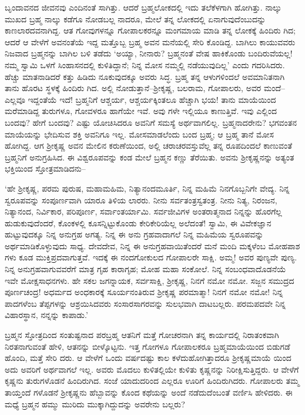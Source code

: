  ಬೃಂದಾವನದ ಜೀವನವು ಎಂದಿನಂತೆ ಸಾಗಿತ್ತು. ಆದರೆ ಬ್ರಹ್ಮಲೋಕದಲ್ಲಿ ಇದು ತಲೆಕೆಳಗಾಗಿ ಹೋಗಿತ್ತು. ನಾಲ್ಕು ಮುಖದ ಬ್ರಹ್ಮ ನಾಲ್ಕು ಕಡೆಗೂ ನೋಡಬಲ್ಲ ನಾದರೂ, ಮೇಲೆ ತನ್ನ ಲೋಕದಲ್ಲಿ ಏನಾಗುವುದೆಂಬುದನ್ನು ಕಾಣಲಾರದವನಾಗಿದ್ದ. ಆತ ಗೋವುಗಳನ್ನೂ ಗೋಪಾಲಕರನ್ನೂ ಮಂಗಮಾಯ ಮಾಡಿ ತನ್ನ ಲೋಕಕ್ಕೆ ಹಿಂದಿರು ಗಿದ; ಆದರೆ ಆ ವೇಳೆಗೆ ಅವನಂತೆಯೆ ಇದ್ದ ಮತ್ತೊಬ್ಬ ಬ್ರಹ್ಮ ಅವನ ಮನೆಯಲ್ಲಿ ಸೇರಿ ಕೊಂಡಿದ್ದ. ಬಾಗಿಲು ಕಾಯುವವರು ನಿಜವಾದ ಬ್ರಹ್ಮನನ್ನು ಬಾಗಿಲ ಬಳಿ ತಡೆದು ‘ಅಯ್ಯಾ, ನೀನಾರು? ಬ್ರಹ್ಮನಂತೆ ವೇಷ ಹಾಕಿಕೊಂಡು ಬಂದಿರುವೆಯಲ್ಲ! ನಮ್ಮ ಸ್ವಾಮಿ ಒಳಗೆ ಸಿಂಹಾಸನದಲ್ಲಿ ಕುಳಿತಿದ್ದಾನೆ; ನಿನ್ನ ಮೋಸ ನಮ್ಮಲ್ಲಿ ನಡೆಯುವುದಿಲ್ಲ’ ಎಂದು ಗದರಿಸಿದರು. ಹೆಚ್ಚು ಮಾತನಾಡಿದರೆ ಕತ್ತು ಹಿಡಿದು ನೂಕುವುದಕ್ಕೂ ಅವರು ಸಿದ್ಧ. ಬ್ರಹ್ಮ ತನ್ನ ಆಳುಗಳಿಂದಲೆ ಅವಮಾನಿತನಾಗಿ ತಾನು ಹೊರಟ ಸ್ಥಳಕ್ಕೆ ಹಿಂದಿರು ಗಿದ. ಅಲ್ಲಿ ನೋಡುತ್ತಾನೆ–ಶ್ರೀಕೃಷ್ಣ, ಬಲರಾಮ, ಗೋಪಾಲರು, ಅವರ ಮಂದೆ– ಎಲ್ಲವೂ ಇದ್ದಂತೆಯೆ ಇದೆ! ಬ್ರಹ್ಮನಿಗೆ ಆಶ್ಚರ್ಯ, ಆಶ್ಚರ್ಯಕ್ಕಿಂತಲೂ ಹೆಚ್ಚಾಗಿ ಭಯ! ತಾನು ಮಾಯೆಯಿಂದ ಮರೆಮಾಡಿದ್ದ ತುರುಗಳೂ, ಗೋವಳರೂ ಹಾಗೆಯೇ ಇವೆ. ಅವು ಗಳೇ ಇಲ್ಲಿಯೂ ಕಾಣುತ್ತಿವೆ. ಇವು ಎಲ್ಲಿಂದ ಬಂದವು? ಹೇಗೆ ಬಂದವು? ಎಷ್ಟು ಯೋಚಿಸಿದರೂ ಅವನಿಗೆ ಸಮಸ್ಯೆ ಅರ್ಥವಾಗಲಿಲ್ಲ. ಬ್ರಹ್ಮನಾದರೇನು? ಭಗವಂತನ ಮಾಯೆಯನ್ನು ಭೇದಿಸುವ ಶಕ್ತಿ ಅವನಿಗೂ ಇಲ್ಲ. ಮೋಸಮಾಡಲೆಂದು ಬಂದ ಬ್ರಹ್ಮ; ಆ ಬ್ರಹ್ಮ ತಾನೆ ಮೋಸ ಹೋಗಿದ್ದ. ಆಗ ಶ್ರೀಕೃಷ್ಣ ಅವನ ಮೇಲಿನ ಕರುಣೆಯಿಂದ, ಅಲ್ಲಿ ಚರಾಚರವಸ್ತುವೆಲ್ಲ ತನ್ನ ರೂಪದಿಂದಲೆ ಕಾಣುವಂತೆ ಬ್ರಹ್ಮನಿಗೆ ಅನುಗ್ರಹಿಸಿದ. ಈ ವಿಶ್ವರೂಪವನ್ನು ಕಂಡ ಮೇಲೆ ಬ್ರಹ್ಮನ ಕಣ್ಣು ತೆರೆಯಿತು. ಅವನು ಶ್ರೀಕೃಷ್ಣನನ್ನು ಅತ್ಯಂತ ಭಕ್ತಿಯಿಂದ ಸ್ತೋತ್ರಮಾಡಿದನು–

‘ಹೇ ಶ್ರೀಕೃಷ್ಣ, ಪರಮ ಪುರುಷ, ಮಹಾಮಹಿಮ, ನಿತ್ಯಾನಂದಮೂರ್ತಿ, ನಿನ್ನ ಮಹಿಮೆ ನಿನಗೊಬ್ಬನಿಗೇ ವೇದ್ಯ. ನಿನ್ನ ಸ್ವರೂಪವನ್ನು ಸಂಪೂರ್ಣವಾಗಿ ಯಾರೂ ತಿಳಿಯ ಲಾರರು. ನೀನು ಸರ್ವತಂತ್ರಸ್ವತಂತ್ರ. ನೀನು ನಿತ್ಯ, ನಿರಂಜನ, ನಿತ್ಯಾನಂದ, ನಿರ್ವಿಕಾರ, ಪರಿಪೂರ್ಣ, ಸರ್ವಾಂತರ್ಯಾಮಿ. ಸರ್ವಜೀವಿಗಳ ಅಂತರಾತ್ಮನಾದ ನಿನ್ನನ್ನು ಹೊರಗೆಲ್ಲ ಹುಡುಕುವುದೆಂದರೆ, ಕೊಂಕಳಲ್ಲಿ ಕೂಸನ್ನಿಟ್ಟುಕೊಂಡು ಕೇರಿಕೇರಿಯೆಲ್ಲ ಅಲೆದಂತೆ! ಸ್ವಾಮಿ, ಈ ವಿವೇಕಜ್ಞಾನ ಹುಟ್ಟುವುದಕ್ಕೂ ನಿನ್ನ ಅನುಗ್ರಹ ಅಗತ್ಯ. ನಿನ್ನ ಈ ಅನು ಗ್ರಹವಾದಾಗಲೆ ನಿನ್ನ ಮಹಿಮೆಯ ಸ್ವರೂಪವನ್ನು ಅರ್ಥಮಾಡಿಕೊಳ್ಳುವುದು ಸಾಧ್ಯ. ದೇವದೇವ, ನಿನ್ನ ಈ ಅನುಗ್ರಹವಾಯಿತೆಂದರೆ ಮನೆ ಮಂದಿ ಮಕ್ಕಳೆಂಬ ಮೋಹಪಾಶ ಗಳು ಕೂಡ ಮುಕ್ತಿಪ್ರದವಾಗುತ್ತವೆ. ಇದಕ್ಕೆ ಈ ನಂದಗೋಕುಲದ ಗೋಪಾಲರೇ ಸಾಕ್ಷಿ. ಅಮ್ಮ! ಅವರ ಪುಣ್ಯವೇ ಪುಣ್ಯ. ನಿನ್ನ ಅನುಗ್ರಹವಾಗುವವರೆಗೆ ಮಾತ್ರ ಗೃಹ ಕಾರಾಗೃಹ; ಮೋಹ ಮಹಾ ಸಂಕೋಲೆ. ನಿನ್ನ ಸಂಬಂಧವಾದೊಡನೆಯೆ ಇವೇ ಮೋಕ್ಷಸಾಧನಗಳು. ಹೇ ಸಕಲ ಜಗನ್ನಾಯಕ, ಸರ್ವಸಾಕ್ಷಿ, ಶ್ರೀಕೃಷ್ಣ, ನಿನಗೆ ನಮೋ ನಮೋ. ಸಜ್ಜನ ಸಮುದ್ರದ ಪೂರ್ಣಚಂದ್ರ! ಅಧರ್ಮದ ಅಂಧಕಾರಕ್ಕೆ ಸೂರ್ಯನಂತಿರುವ ಶ್ರೀಕೃಷ್ಣ ಪರಮಾತ್ಮಾ! ನಿನಗೆ ನಮೋ ನಮೋ! ನಿನ್ನ ಪಾದಗಳೆಂಬ ತೆಪ್ಪಗಳನ್ನು ಆಶ್ರಯಿಸಿದವರು ಸಂಸಾರಸಾಗರವನ್ನು ಸುಲಭವಾಗಿ ದಾಟಬಲ್ಲರು. ಪರಮಪದವೇ ನಿನ್ನ ವಿಹಾರಸ್ಥಾನ, ನನ್ನನ್ನು ಕಾಪಾಡು.’

ಬ್ರಹ್ಮನ ಸ್ತೋತ್ರದಿಂದ ಸಂತುಷ್ಟನಾದ ಪರಬ್ರಹ್ಮ ಆತನಿಗೆ ಮತ್ತೆ ಗೋಚರನಾಗಿ ತನ್ನ ಕಾರ್ಯದಲ್ಲಿ ನಿರಾತಂಕವಾಗಿ ನಿರತನಾಗುವಂತೆ ಹೇಳಿ, ಆತನನ್ನು ಬೀಳ್ಕೊಟ್ಟನು. ಇತ್ತ ಗೋಗಳೂ ಗೋಪಾಲಕರೂ ಬ್ರಹ್ಮಮಾಯೆಯಿಂದ ಬಿಡುಗಡೆ ಹೊಂದಿ, ಮತ್ತೆ ಸೇರಿ ದರು. ಆ ವೇಳೆಗೆ ಒಂದು ವರ್ಷದಷ್ಟು ಕಾಲ ಕಳೆದುಹೋಗಿತ್ತಾದರೂ ಶ್ರೀಕೃಷ್ಣಮಾಯೆ ಯಿಂದ ಅದು ಅವರಿಗೆ ಅರ್ಥವಾಗಲೆ ಇಲ್ಲ. ಅವರು ಮೊದಲು ಕುಳಿತಲ್ಲಿಯೇ ಕುಳಿತು ಕೃಷ್ಣನನ್ನು ನಿರೀಕ್ಷಿಸುತ್ತಿದ್ದರು. ಆ ವೇಳೆಗೆ ಕೃಷ್ಣನು ತುರುಗಳೊಡನೆ ಹಿಂದಿರುಗಿದ. ಸಂಜೆ ಯಾದುದರಿಂದ ಎಲ್ಲರೂ ಊರಿಗೆ ಹಿಂದಿರುಗಿದರು. ಗೋಪಾಲರು ತಮ್ಮ ತಾಯ್ತಂದೆ ಗಳೊಡನೆ ಶ್ರೀಕೃಷ್ಣನು ಹೆಬ್ಬಾವನ್ನು ಕೊಂದ ಕಥೆಯನ್ನು ಅಂದೆ ನಡೆದುದೆಂಬಂತೆ ವರ್ಣಿಸಿ ಹೇಳಿದರು. ಈ ಮಧ್ಯೆ ಬ್ರಹ್ಮನ ಹಮ್ಮು ಮುರಿದು ಮುಕ್ಕಾಗಿದ್ದುದನ್ನು ಅವರೇನು ಬಲ್ಲರು?

